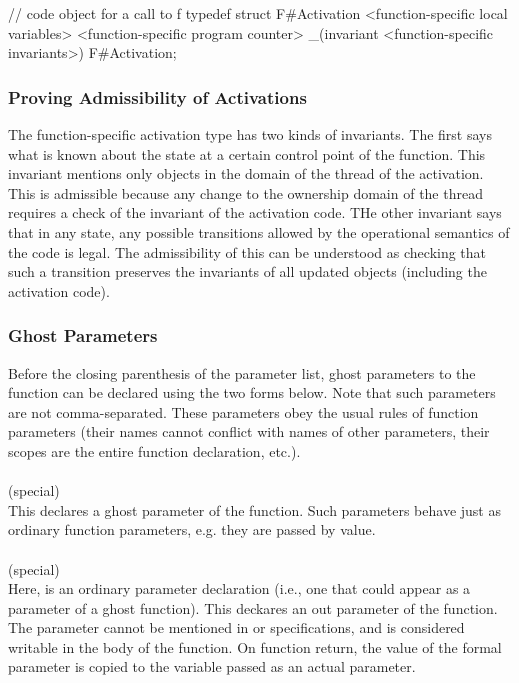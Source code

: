\documentclass[preprint,nocopyrightspace]{sigplanconf}
\begin{document}
{{{\begin{VCC}
// code object for a call to f
typedef struct F#Activation {
  <function-specific local variables>
  <function-specific program counter>
  _(invariant <function-specific invariants>)
} F#Activation;  
\end{VCC}

\subsubsection{Proving Admissibility of Activations}
The function-specific activation type has two kinds of invariants. The
first says what is known about the state at a certain control point of
the function. This invariant mentions only objects in the domain of
the thread of the activation. This is admissible because any change to
the ownership domain of the thread requires a check of the invariant
of the activation code. THe other invariant says that in any state,
any possible transitions allowed by the operational semantics of the
code is legal. The admissibility of this can be understood as checking
that such a transition preserves the invariants of all updated objects
(including the activation code).



\subsubsection{Ghost Parameters}

Before the closing parenthesis of the parameter list, ghost parameters
to the function can be declared using the two forms below. Note that
such parameters are not comma-separated.
These parameters obey the usual rules of function
parameters (their names cannot conflict with names of other
parameters, their scopes are the entire function declaration, etc.).
\\\\
 (special)\\
This declares a ghost parameter of the function. Such parameters
behave just as ordinary function parameters, e.g. they are passed by value.
\\\\
 (special)\\
Here,  is an ordinary parameter declaration (i.e., one that
could appear as a parameter of a ghost function). This 
deckares an out parameter of the function. The parameter
cannot be mentioned in  or 
specifications, and is considered writable in the body of the
function. On function return, the value of the formal parameter is
copied to the variable passed as an actual parameter.

}}}
\end{document}
